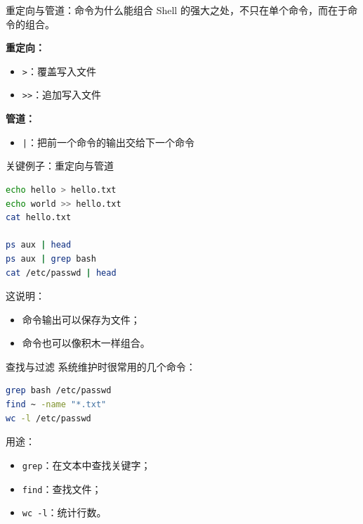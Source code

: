 \documentclass[aspectratio=169]{beamer}
\begin{document}
\begin{frame}{重定向与管道：命令为什么能组合}
Shell 的强大之处，不只在单个命令，而在于命令的组合。

\vspace{0.5em}
\textbf{重定向：}
\begin{itemize}
  \item \texttt{>}：覆盖写入文件
  \item \texttt{>>}：追加写入文件
\end{itemize}

\textbf{管道：}
\begin{itemize}
  \item \texttt{|}：把前一个命令的输出交给下一个命令
\end{itemize}
\end{frame}

\begin{frame}[fragile]{关键例子：重定向与管道}
\begin{lstlisting}[language=bash]
echo hello > hello.txt
echo world >> hello.txt
cat hello.txt

ps aux | head
ps aux | grep bash
cat /etc/passwd | head
\end{lstlisting}

\vspace{0.5em}
这说明：
\begin{itemize}
  \item 命令输出可以保存为文件；
  \item 命令也可以像积木一样组合。
\end{itemize}
\end{frame}

\begin{frame}[fragile]{查找与过滤}
系统维护时很常用的几个命令：

\begin{lstlisting}[language=bash]
grep bash /etc/passwd
find ~ -name "*.txt"
wc -l /etc/passwd
\end{lstlisting}

\vspace{0.5em}
用途：
\begin{itemize}
  \item \texttt{grep}：在文本中查找关键字；
  \item \texttt{find}：查找文件；
  \item \texttt{wc -l}：统计行数。
\end{itemize}
\end{frame}
\end{document}
